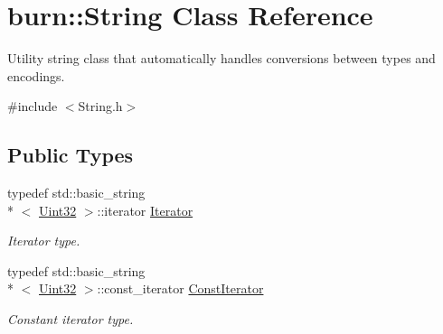 \hypertarget{classburn_1_1_string}{\section{burn\-:\-:String Class Reference}
\label{classburn_1_1_string}
}


Utility string class that automatically handles conversions between types and encodings.  




{\ttfamily \#include $<$String.\-h$>$}

\subsection*{Public Types}
\begin{DoxyCompactItemize}
\item 
typedef std\-::basic\-\_\-string\\*
$<$ \hyperlink{namespaceburn_ab40b09022209bd449d317c1f0e95356b}{Uint32} $>$\-::iterator \hyperlink{classburn_1_1_string_a84bf349f5c87cfcca666afade353be83}{Iterator}
\begin{DoxyCompactList}\small\item\em Iterator type. \end{DoxyCompactList}\item 
typedef std\-::basic\-\_\-string\\*
$<$ \hyperlink{namespaceburn_ab40b09022209bd449d317c1f0e95356b}{Uint32} $>$\-::const\-\_\-iterator \hyperlink{classburn_1_1_string_a323849432c1bf90a416b1afceb37e1ff}{Const\-Iterator}
\begin{DoxyCompactList}\small\item\em Constant iterator type. \end{DoxyCompactList}\end{DoxyCompactItemize}
